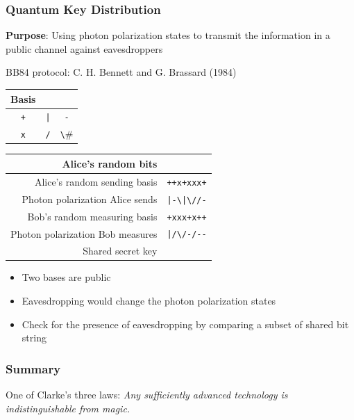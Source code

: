 \begin{frame}[fragile]\frametitle{Quantum Key Distribution}
\textbf{Purpose}: Using photon polarization states to transmit the information in a public channel against eavesdroppers

\begin{exampleblock}{BB84 protocol: C. H. Bennett and G. Brassard (1984)}
{\centering	
\begin{tabular}{|c|c|c|} \hline
Basis & \verb#0# & \verb#1# \\ \hline
\verb#+# & \verb#|# & \verb#-# \\ \hline
\verb#x# & \verb#/# & \verb#\# \\ \hline
\end{tabular}	
\begin{tabular}{|r|c|} \hline
Alice's random bits & \verb#01101001# \\ \hline
Alice's random sending basis & \verb#++x+xxx+# \\ \hline
Photon polarization Alice sends & \verb#|-\|\//-# \\ \hline
Bob's random measuring basis & \verb#+xxx+x++# \\ \hline
Photon polarization Bob measures & \verb#|/\/-/--# \\ \hline
Shared secret key & \verb#0 1  0 1# \\ \hline
\end{tabular}
}
\begin{itemize}
\item Two bases are public
\item Eavesdropping would change the photon polarization states
\item Check for the presence of eavesdropping by comparing a subset of shared bit string
\end{itemize}
\end{exampleblock}
\end{frame}

\begin{frame}\frametitle{Summary}
One of Clarke’s three laws: \it{Any sufficiently advanced technology is indistinguishable from magic.}

\end{frame}

